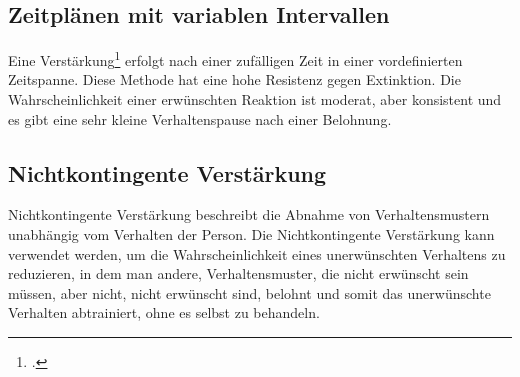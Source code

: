 \subsection{Zeitplänen mit variablen Intervallen}
Eine Verstärkung\footcite{variabler-Intervall} erfolgt nach einer zufälligen Zeit in einer vordefinierten Zeitspanne. 
Diese Methode hat eine hohe Resistenz gegen Extinktion. Die Wahrscheinlichkeit einer erwünschten Reaktion ist moderat, aber konsistent und es gibt eine sehr kleine Verhaltenspause nach einer Belohnung. 
\subsection{Nichtkontingente Verstärkung}
Nichtkontingente Verstärkung beschreibt die Abnahme von Verhaltensmustern unabhängig vom Verhalten der Person. Die Nichtkontingente Verstärkung kann verwendet werden, um die Wahrscheinlichkeit eines unerwünschten Verhaltens zu reduzieren, in dem man andere, Verhaltensmuster, die nicht erwünscht sein müssen, aber nicht, nicht erwünscht sind, belohnt und somit das unerwünschte Verhalten abtrainiert, ohne es selbst zu behandeln. 
